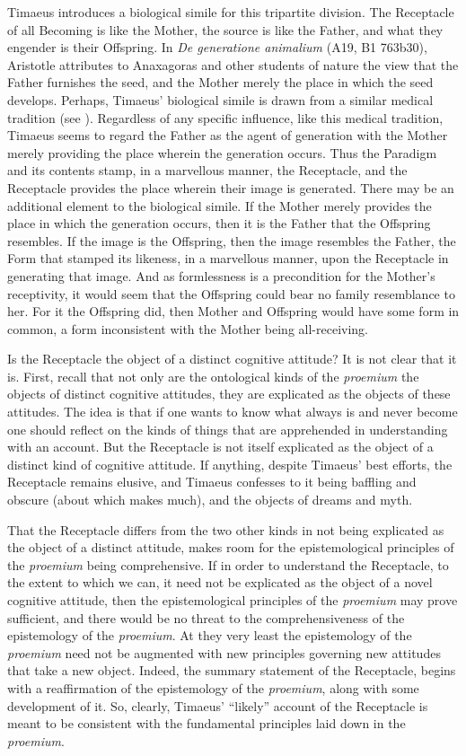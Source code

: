 Timaeus introduces a biological simile for this tripartite division. The Receptacle of all Becoming is like the Mother, the source is like the Father, and what they engender is their Offspring.  In \emph{De generatione animalium} (A19, B1 763b30), Aristotle attributes to Anaxagoras and other students of nature the view that the Father furnishes the seed, and the Mother merely the place in which the seed develops. Perhaps, Timaeus' biological simile is drawn from a similar medical tradition (see \citealt[187]{Cornford:1935fk}). Regardless of any specific influence, like this medical tradition, Timaeus seems to regard the Father as the agent of generation with the Mother merely providing the place wherein the generation occurs. Thus the Paradigm and its contents stamp, in a marvellous manner, the Receptacle, and the Receptacle provides the place wherein their image is generated. There may be an additional element to the biological simile. If the Mother merely provides the place in which the generation occurs, then it is the Father that the Offspring resembles. If the image is the Offspring, then the image resembles the Father, the Form that stamped its likeness, in a marvellous manner, upon the Receptacle in generating that image. And as formlessness is a precondition for the Mother's receptivity, it would seem that the Offspring could bear no family resemblance to her. For it the Offspring did, then Mother and Offspring would have some form in common, a form inconsistent with the Mother being all-receiving. 

Is the Receptacle the object of a distinct cognitive attitude? It is not clear that it is. First, recall that not only are the ontological kinds of the \emph{proemium} the objects of distinct cognitive attitudes, they are explicated as the objects of these attitudes. The idea is that if one wants to know what always is and never become one should reflect on the kinds of things that are apprehended in understanding with an account. But the Receptacle is not itself explicated as the object of a distinct kind of cognitive attitude. If anything, despite Timaeus' best efforts, the Receptacle remains elusive, and Timaeus confesses to it being baffling and obscure (about which \citealt{Derrida:1993aa} makes much), and the objects of dreams and myth.

That the Receptacle differs from the two other kinds in not being explicated as the object of a distinct attitude, makes room for the epistemological principles of the \emph{proemium} being comprehensive. If in order to understand the Receptacle, to the extent to which we can, it need not be explicated as the object of a novel cognitive attitude, then the epistemological principles of the \emph{proemium} may prove sufficient, and there would be no threat to the comprehensiveness of the epistemology of the \emph{proemium}. At they very least the epistemology of the \emph{proemium} need not be augmented with new principles governing new attitudes that take a new object. Indeed, the summary statement of the Receptacle, begins with a reaffirmation of the epistemology of the \emph{proemium}, along with some development of it. So, clearly, Timaeus' ``likely'' account of the Receptacle is meant to be consistent with the fundamental principles laid down in the \emph{proemium}.

